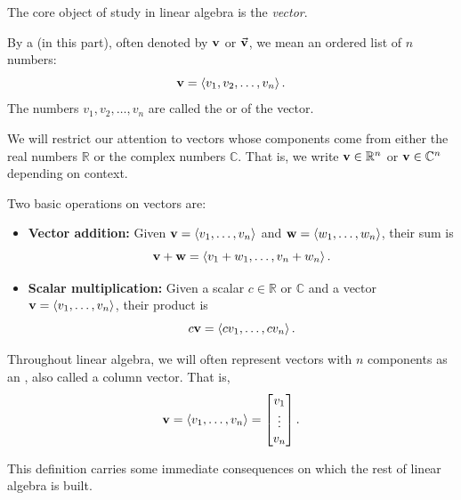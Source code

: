 The core object of study in linear algebra is the \emph{vector}.

\begin{dfn}
    By a  (in this part), often denoted by \( \vb{v} \) or \( \va{v} \), we mean an ordered list of \( n \) numbers:
    \[
        \vb{v} = \left< v_1, v_2, \dots, v_n \right>.
    \]
    The numbers \( v_1, v_2, \dots, v_n \) are called the  or  of the vector. 
    
    We will restrict our attention to vectors whose components come from either the real numbers \( \mathbb{R} \) or the complex numbers \( \mathbb{C} \). That is, we write \( \vb{v} \in \mathbb{R}^n \) or \( \vb{v} \in \mathbb{C}^n \) depending on context.
    
    Two basic operations on vectors are:
    \begin{itemize}
        \item \textbf{Vector addition:} Given \( \vb{v} = \left< v_1, \dots, v_n \right> \) and \( \vb{w} = \left< w_1, \dots, w_n \right> \), their sum is
        \[
            \vb{v} + \vb{w} = \left< v_1 + w_1, \dots, v_n + w_n \right>.
        \]
        
        \item \textbf{Scalar multiplication:} Given a scalar \( c \in \mathbb{R} \) or \( \mathbb{C} \) and a vector \( \vb{v} = \left< v_1, \dots, v_n \right> \), their product is
        \[
            c \vb{v} = \left< c v_1, \dots, c v_n \right>.
        \]
    \end{itemize}
Throughout linear algebra, we will often represent vectors with \( n \) components as an , also called a column vector. That is,
\[
    \vb{v} = \left< v_1, \dots, v_n \right> = \begin{bmatrix}
        v_1 \\
        \vdots \\
        v_n
    \end{bmatrix}.
\]
\end{dfn}

This definition carries some immediate consequences on which the rest of linear algebra is built.

